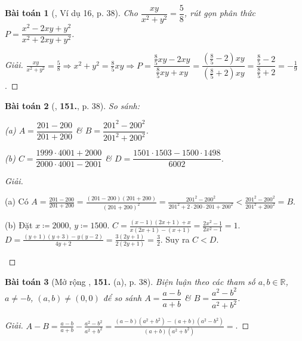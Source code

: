\documentclass{article}
\numberwithin{equation}{section}
\newtheorem{baitoan}{Bài toán}[section]
\begin{document}
\begin{baitoan}[\cite{Tuyen_Toan_8}, Ví dụ 16, p. 38]
	Cho $\dfrac{xy}{x^2 + y^2} = \dfrac{5}{8}$, rút gọn phân thức $P = \dfrac{x^2 - 2xy + y^2}{x^2 + 2xy + y^2}$.
\end{baitoan}

\begin{proof}[Giải]
	$\frac{xy}{x^2 + y^2} = \frac{5}{8}\Rightarrow x^2 + y^2 = \frac{8}{5}xy\Rightarrow P = \dfrac{\frac{8}{5}xy - 2xy}{\frac{8}{5}xy + xy} = \dfrac{\left(\frac{8}{5} - 2\right)xy}{\left(\frac{8}{5} + 2\right)xy} = \dfrac{\frac{8}{5} - 2}{\frac{8}{5} + 2} = -\frac{1}{9}$.
\end{proof}

\begin{baitoan}[\cite{Tuyen_Toan_8}, \textbf{151.}, p. 38]
	So sánh:
	\begin{enumerate*}
		\item[(a)] $A = \dfrac{201 - 200}{201 + 200}$ \& $B = \dfrac{201^2 - 200^2}{201^2 + 200^2}$.
		\item[(b)] $C = \dfrac{1999\cdot 4001 + 2000}{2000\cdot 4001 - 2001}$ \& $D = \dfrac{1501\cdot 1503 - 1500\cdot 1498}{6002}$.
	\end{enumerate*}
\end{baitoan}

\begin{proof}[Giải]
	\begin{enumerate*}
		\item[(a)] Có $A = \frac{201 - 200}{201 + 200} = \frac{(201 - 200)(201 + 200)}{(201 + 200)^2} = \frac{201^2 - 200^2}{201^2 + 2\cdot200\cdot201 + 200^2} < \frac{201^2 - 200^2}{201^2 + 200^2} = B$.
		\item[(b)] Đặt $x\coloneqq2000$, $y\coloneqq1500$. $C = \frac{(x - 1)(2x + 1) + x}{x(2x + 1) - (x + 1)} = \frac{2x^2 - 1}{2x^2 - 1} = 1$. $D = \frac{(y + 1)(y + 3) - y(y - 2)}{4y + 2} = \frac{3(2y + 1)}{2(2y + 1)} = \frac{3}{2}$. Suy ra $C < D$.
	\end{enumerate*}	
\end{proof}

\begin{baitoan}[Mở rộng \cite{Tuyen_Toan_8}, \textbf{151.} (a), p. 38]
	Biện luận theo các tham số $a,b\in\mathbb{R}$, $a\ne-b$, $(a,b)\ne(0,0)$ để so sánh $A = \dfrac{a - b}{a + b}$ \& $B = \dfrac{a^2 - b^2}{a^2 + b^2}$.
\end{baitoan}

\begin{proof}[Giải]
	$A - B = \frac{a - b}{a + b} - \frac{a^2 - b^2}{a^2 + b^2} = \frac{(a - b)(a^2 + b^2) - (a + b)(a^2 - b^2)}{(a + b)(a^2 + b^2)} = $.
\end{proof}
\end{document}
